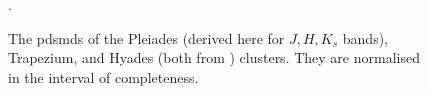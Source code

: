 \begin{figure}[htp]
\begin{center}
\caption{The \glspl{pdsmd} of the Pleiades (derived here for $J,H,K_s$ bands), Trapezium, and Hyades (both from \citet{Bouy2015}) clusters. They are normalised in the interval of completeness.}
\label{fig:PDSMDcomparison}.
\end{center}
\end{figure}

